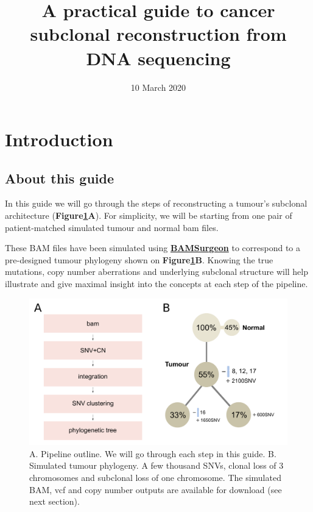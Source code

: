 \documentclass[]{article}
\title{A practical guide to cancer subclonal reconstruction from DNA sequencing}
\author{}
\date{10 March 2020}
\begin{document}
\maketitle

{
\setcounter{tocdepth}{2}
\tableofcontents
}
\newpage

\hypertarget{introduction}{%
\section{Introduction}\label{introduction}}

\hypertarget{about-this-guide}{%
\subsection{About this guide}\label{about-this-guide}}

In this guide we will go through the steps of reconstructing a tumour's
subclonal architecture (\textbf{Figure\ref{Figure1}A}). For simplicity,
we will be starting from one pair of patient-matched simulated tumour
and normal bam files.

These BAM files have been simulated using
\href{https://github.com/adamewing/bamsurgeon}{\textbf{BAMSurgeon}} to
correspond to a pre-designed tumour phylogeny shown on
\textbf{Figure\ref{Figure1}B}. Knowing the true mutations, copy number
aberrations and underlying subclonal structure will help illustrate and
give maximal insight into the concepts at each step of the pipeline.

\begin{figure}[H]
  \centering
  \includegraphics{figures/fig1_pipelineOutline.pdf}
  \caption{A. Pipeline outline. We will go through each step in this
  guide. B. Simulated tumour phylogeny. A few thousand SNVs, clonal
  loss of 3 chromosomes and subclonal loss of one chromosome. 
  The simulated BAM, vcf and copy number outputs are available
  for download (see next section).}
  \label{Figure1}
\end{figure}
\end{document}
